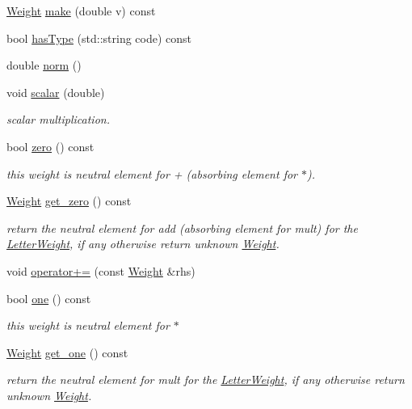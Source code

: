 \begin{DoxyCompactItemize}
\mbox{\hyperlink{classWeight}{Weight}} \mbox{\hyperlink{group__weight_gaf8f62c5cee5ffa37e30ef7239a33b729}{make}} (double v) const
\item 
bool \mbox{\hyperlink{group__weight_gad236331c6f6ca8dd9fced5ffffd79f35}{has\+Type}} (std\+::string code) const
\item 
double \mbox{\hyperlink{group__weight_ga68bd9621500f31ba5f0fbe04dc5a00e4}{norm}} ()
\item 
void \mbox{\hyperlink{group__weight_ga5d63ead0a1d21ee5628c643fca773903}{scalar}} (double)
\begin{DoxyCompactList}\small\item\em scalar multiplication. \end{DoxyCompactList}\item 
bool \mbox{\hyperlink{group__weight_gad0c93ac5f963b02ca3f6c1d5d02f5d61}{zero}} () const
\begin{DoxyCompactList}\small\item\em this weight is neutral element for + (absorbing element for $\ast$). \end{DoxyCompactList}\item 
\mbox{\hyperlink{classWeight}{Weight}} \mbox{\hyperlink{group__weight_gaf7214d45d290b39f6bb2555fc46adf55}{get\+\_\+zero}} () const
\begin{DoxyCompactList}\small\item\em return the neutral element for add (absorbing element for mult) for the \mbox{\hyperlink{classLetterWeight}{Letter\+Weight}}, if any otherwise return unknown \mbox{\hyperlink{classWeight}{Weight}}. \end{DoxyCompactList}\item 
void \mbox{\hyperlink{classWeight_a840aea7512916a91b6baf0a0772b46db}{operator+=}} (const \mbox{\hyperlink{classWeight}{Weight}} \&rhs)
\item 
bool \mbox{\hyperlink{group__weight_ga0fb0a47475e245e955aa6e7926f7a0f6}{one}} () const
\begin{DoxyCompactList}\small\item\em this weight is neutral element for $\ast$ \end{DoxyCompactList}\item 
\mbox{\hyperlink{classWeight}{Weight}} \mbox{\hyperlink{group__weight_ga48012227b61aa4c10064bed70936d78e}{get\+\_\+one}} () const
\begin{DoxyCompactList}\small\item\em return the neutral element for mult for the \mbox{\hyperlink{classLetterWeight}{Letter\+Weight}}, if any otherwise return unknown \mbox{\hyperlink{classWeight}{Weight}}. \end{DoxyCompactList}\item 

\end{DoxyCompactItemize}
